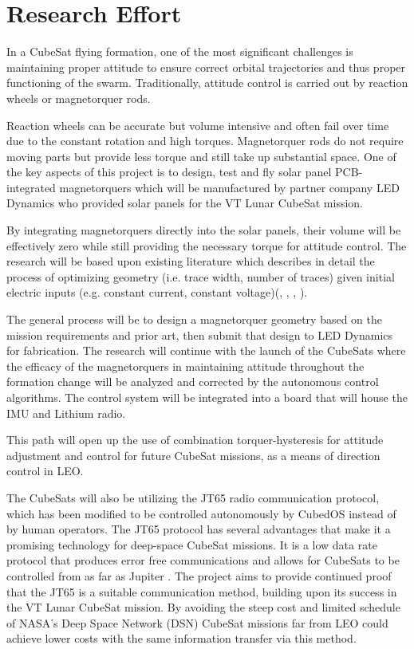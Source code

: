 \section{Research Effort}

In a CubeSat flying formation, one of the most significant challenges
is maintaining proper attitude to ensure correct orbital trajectories
and thus proper functioning of the swarm. Traditionally, attitude
control is carried out by reaction wheels or magnetorquer rods.

Reaction wheels can be accurate but volume intensive and often fail
over time due to the constant rotation and high torques. Magnetorquer
rods do not require moving parts but provide less torque and still
take up substantial space. One of the key aspects of this project is
to design, test and fly solar panel PCB-integrated magnetorquers which
will be manufactured by partner company LED Dynamics who provided
solar panels for the VT Lunar CubeSat mission.

By integrating magnetorquers directly into the solar panels, their
volume will be effectively zero while still providing the necessary
torque for attitude control. The research will be based upon existing
literature which describes in detail the process of optimizing
geometry (i.e. trace width, number of traces) given initial electric
inputs (e.g. constant current, constant voltage)(\cite{ali:2021},
\cite{khan:2022}, \cite{sokal:2019}, \cite{sorensen:2021}).

 The general process will be to design a magnetorquer geometry based
 on the mission requirements and prior art, then submit that design to
 LED Dynamics for fabrication. The research will continue with the
 launch of the CubeSats where the efficacy of the magnetorquers in
 maintaining attitude throughout the formation change will be analyzed
 and corrected by the autonomous control algorithms. The control
 system will be integrated into a board that will house the IMU and
 Lithium radio.

This path will open up the use of combination torquer-hysteresis for
attitude adjustment and control for future CubeSat missions, as a
means of direction control in LEO.

The CubeSats will also be utilizing the JT65 radio communication
protocol, which has been modified to be controlled autonomously by
CubedOS instead of by human operators. The JT65 protocol has several
advantages that make it a promising technology for deep-space CubeSat
missions. It is a low data rate protocol that produces error free
communications and allows for CubeSats to be controlled from as far as
Jupiter \cite{brandon:2019}. The project aims to provide continued
proof that the JT65 is a suitable communication method, building upon
its success in the VT Lunar CubeSat mission. By avoiding the steep
cost and limited schedule of NASA’s Deep Space Network (DSN) CubeSat
missions far from LEO could achieve lower costs with the same
information transfer via this method.

